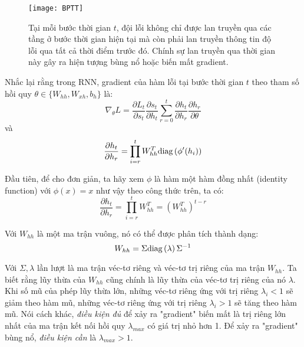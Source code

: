 \begin{figure}
	\centering
	\texttt{[image: BPTT]}
	\caption[Minh họa thuật toán "Back propagation through time"]{Tại mỗi bước thời gian $t$, đội lỗi không chỉ được lan truyền qua các tầng ở bước thời gian hiện tại mà còn phải lan truyền thông tin độ lỗi qua tất cả thời điểm trước đó. Chính sự lan truyền qua thời gian này gây ra hiện tượng bùng nổ hoặc biến mất gradient.}
	\label{fig_BTT}
\end{figure}

Nhắc lại rằng trong RNN, gradient của hàm lỗi tại bước thời gian $t$ theo tham số hồi quy $\theta  \in \{W_{hh}, W_{xh}, b_h \}$ là:
\begin{equation} \label{beginGradientVanish0}
	\nabla_{\theta}L = \frac{\partial L_t}{\partial s_t} \frac{\partial s_t}{\partial h_t} \sum_{r=0}^{t}  \frac{\partial h_t}{\partial h_r}\frac{\partial h_r}{\partial \theta}
\end{equation}
và 
\begin{equation} \label{beginGradientVanish1}
	\frac{\partial h_t}{\partial h_r} = \prod_{i=r}^{t} W_{hh}^T \mathrm{diag} \left( \phi'(h_i) \right)
\end{equation}

Đầu tiên, để cho đơn giản, ta hãy xem $\phi$ là hàm một hàm đồng nhất (identity function) với $\phi(x) = x$ như vậy theo công thức trên, ta có:
\begin{equation} \label{gradientVanish3}
	\frac{\partial h_t}{\partial h_r} = \prod_{i=r}^{t} W_{hh}^T = \left (W_{hh}^T \right)^{t-r}
\end{equation}

Với $W_{hh}$ là một ma trận vuông, nó có thể được phân tích thành dạng:
\begin{equation} \label{gradientVanish4}
	W_{hh} = \Sigma \mathrm{diag} \left(\lambda \right) \Sigma^{-1} 
\end{equation}

Với $\Sigma, \lambda$ lần lượt là ma trận véc-tơ riêng và véc-tơ trị riêng của ma trận $W_{hh}$. Ta biết rằng lũy thừa của $W_{hh}$ cũng chính là lũy thừa của véc-tơ trị riêng của nó $\lambda$. Khi số mũ của phép lũy thừa lớn, những véc-tơ riêng ứng với trị riêng $\lambda_i < 1$ sẽ giảm theo hàm mũ, những véc-tơ riêng ứng với trị riêng $\lambda_i > 1$ sẽ tăng theo hàm mũ. Nói cách khác, \textit{điều kiện đủ} để xảy ra "gradient" biến mất là trị riêng lớn nhất của ma trận kết nối hồi quy $\lambda_{max}$ có giá trị nhỏ hơn 1. Để xảy ra "gradient" bùng nổ, \textit{điều kiện cần} là $\lambda_{max} > 1$.

